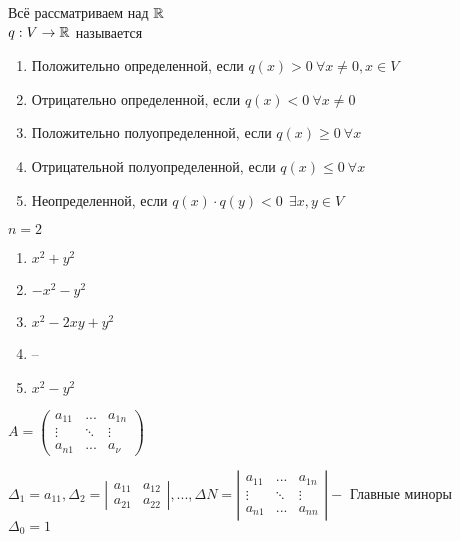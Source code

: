 \begin{Def} 
	Всё рассматриваем над $\mathbb{R}$\\
	$q: V \to \mathbb{R}$ называется 
	\begin{enumerate}
		\item Положительно определенной, если $q(x) > 0 \ \forall x \neq 0, x \in V$
		\item Отрицательно определенной, если $q(x) < 0 \ \forall x \neq 0$
		\item Положительно полуопределенной, если $q(x) \geqslant 0 \ \forall x$
		\item Отрицательной полуопределенной, если $q(x) \leqslant 0 \ \forall x$
		\item Неопределенной, если $q(x) \cdot q(y) < 0 \ \ \exists x, y \in V$
	\end{enumerate}
\end{Def} 

\begin{Example}
	$n = 2$
	\begin{enumerate}
		\item $x^2 + y^2$
		\item $-x^2 - y^2$
		\item $x^2 - 2xy + y^2$
		\item --
		\item $x^2 - y^2$
	\end{enumerate}	
\end{Example}


\begin{Def} 
	$A = \left(
		\begin{array}{cccc}
			a_{11} & ... &  a_{1n}\\
			\vdots & \ddots & \vdots\\
			a_{n1} & ... & a_{\nu}
		\end{array}
	\right)$

	$\Delta_1 = a_{11}, \Delta_2 = \left| \begin{array}{cc}
		a_{11} & a_{12}\\
		a_{21} & a_{22}
	\end{array} \right|, ..., \Delta N = \left| \begin{array}{ccc}
		a_{11} & ... & a_{1n}\\
		\vdots & \ddots & \vdots\\
		a_{n1} & ... & a_{nn}
	\end{array} \right| -$ Главные миноры\\
	$\Delta_0 = 1$
\end{Def} 

